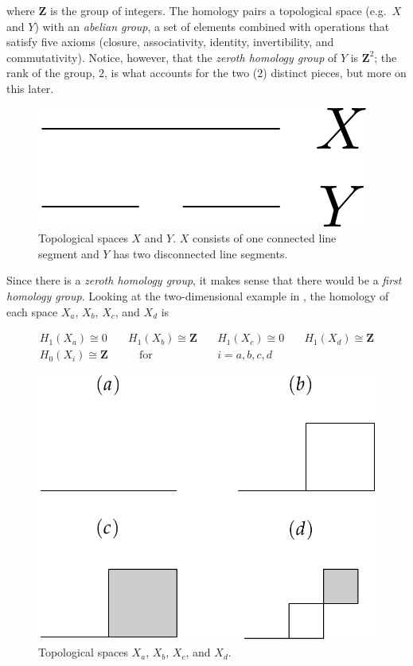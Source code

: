 where $\mathbf{Z}$ is the group of integers. The homology pairs a topological space (e.g.\ $X$ and $Y$) with an \textit{abelian group}, a set of elements combined with operations that satisfy five axioms (closure, associativity, identity, invertibility, and commutativity). Notice, however, that the \textit{zeroth homology group} of $Y$ is $\mathbf{Z}^2$; the rank of the group, $2$, is what accounts for the two ($2$) distinct pieces, but more on this later.

\begin{figure}
	\begin{center}
		\includegraphics[width=0.2\columnwidth]{Figs/homology1d.pdf}
		\caption{\label{fig:homology1d} Topological spaces $X$ and $Y$. $X$ consists of one connected line segment and $Y$ has two disconnected line segments.}
	\end{center}
\end{figure}

Since there is a \textit{zeroth homology group}, it makes sense that there would be a \textit{first homology group}. Looking at the two-dimensional example in , the homology of each space $X_a$, $X_b$, $X_c$, and $X_d$ is

\begin{align}
	H_1(X_a) \cong 0  & \quad H_1(X_b) \cong \mathbf{Z} & \quad H_1(X_c) \cong 0 & \quad H_1(X_d) \cong \mathbf{Z} \\
	H_0(X_i) \cong \mathbf{Z} & \qquad \text{for} & \quad i = a, b, c, d \label{eq:homology2d}
\end{align}

\begin{figure}
	\begin{center}
		\includegraphics[width=0.6\columnwidth]{Figs/homology2d.pdf}
		\caption{\label{fig:homology2d} Topological spaces $X_a$, $X_b$, $X_c$, and $X_d$.}
	\end{center}
\end{figure}

